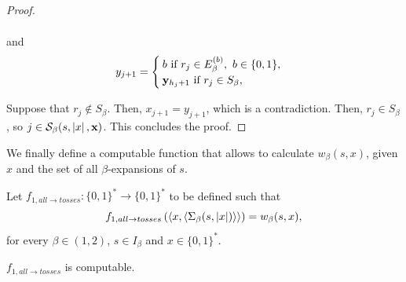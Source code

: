 \begin{proof}
\begin{enumerate}[label = (\alph*)]
\begin{align}
        \end{align}
        and 
        \begin{align}
            y_{j+1} = \begin{cases}
                b \ \text{if} \ r_j \in E_\beta^{(b)}, \ b \in \{0,1\},\\
                {\bf y}_{h_j+1} \ \text{if} \ r_j \in S_\beta,
            \end{cases}
        \end{align}
    \end{enumerate}
    Suppose that $r_j \notin S_\beta$. Then, $x_{j+1} = y_{j+1}$, which is a contradiction. Then, $r_j \in S_\beta$, so $j \in \mathcal{S}_\beta(s,\left| x \right|, {\bf x})$. This concludes the proof.
\end{proof}

We finally define a computable function that allows to calculate $w_\beta(s,x)$, given $x$ and the set of all $\beta$-expansions of $s$.
\begin{definition}
    Let $f_{1,all \to tosses} : \{0,1\}^\ast \to \{0,1\}^\ast$ to be defined such that 
    \begin{equation}
        f_{1,all \to tosses}\left(\langle x, \langle \Sigma_\beta(s,\left| x \right|) \rangle \rangle\right) = w_\beta(s,x),
    \end{equation}
    for every $\beta \in (1,2)$, $s \in I_\beta$ and $x \in \{0,1\}^\ast$.
\end{definition}
\begin{lemma}\label{lem:f 1 all to noise is computable}
    $f_{1,all \to tosses}$ is computable.
\end{lemma}
